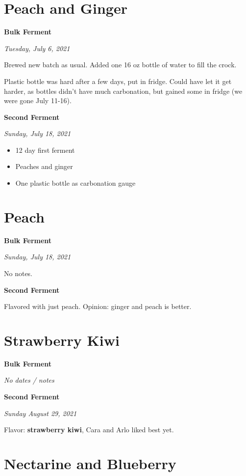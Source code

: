 \documentclass[
]{book}
\providecommand{\tightlist}{%
  \setlength{\itemsep}{0pt}\setlength{\parskip}{0pt}}
\begin{document}
\hypertarget{peach-and-ginger}{%
\section{Peach and Ginger}\label{peach-and-ginger}}

\textbf{Bulk Ferment}

\emph{Tuesday, July 6, 2021}

Brewed new batch as usual. Added one 16 oz bottle of water to fill the crock.

Plastic bottle was hard after a few days, put in fridge. Could have let it get harder, as bottles didn't have much carbonation, but gained some in fridge (we were gone July 11-16).

\textbf{Second Ferment}

\emph{Sunday, July 18, 2021}

\begin{itemize}
\tightlist
\item
  12 day first ferment
\item
  Peaches and ginger
\item
  One plastic bottle as carbonation gauge
\end{itemize}

\hypertarget{peach}{%
\section{Peach}\label{peach}}

\textbf{Bulk Ferment}

\emph{Sunday, July 18, 2021}

No notes.

\textbf{Second Ferment}

Flavored with just peach. Opinion: ginger and peach is better.

\hypertarget{strawberry-kiwi}{%
\section{Strawberry Kiwi}\label{strawberry-kiwi}}

\textbf{Bulk Ferment}

\emph{No dates / notes}

\textbf{Second Ferment}

\emph{Sunday August 29, 2021}

Flavor: \textbf{strawberry kiwi}, Cara and Arlo liked best yet.

\hypertarget{nectarine-and-blueberry}{%
\section{Nectarine and Blueberry}\label{nectarine-and-blueberry}}
\end{document}
